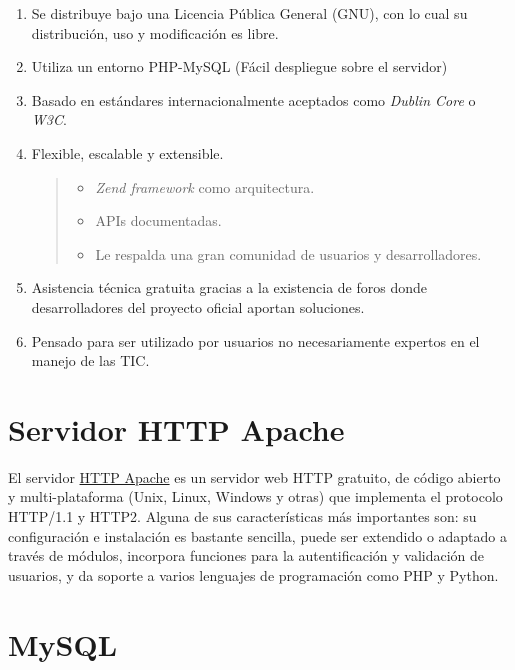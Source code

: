 \documentclass[
]{article}
\providecommand{\tightlist}{%
  \setlength{\itemsep}{0pt}\setlength{\parskip}{0pt}}
\begin{document}
\begin{enumerate}
\def\labelenumi{\arabic{enumi}.}
\item
  Se distribuye bajo una Licencia Pública General (GNU), con lo cual su
  distribución, uso y modificación es libre.
\item
  Utiliza un entorno PHP-MySQL (Fácil despliegue sobre el servidor)
\item
  Basado en estándares internacionalmente aceptados como \emph{Dublin
  Core} o \emph{W3C}.
\item
  Flexible, escalable y extensible.

  \begin{quote}
  \begin{itemize}
  \tightlist
  \item
    \emph{Zend framework} como arquitectura.
  \item
    APIs documentadas.
  \item
    Le respalda una gran comunidad de usuarios y desarrolladores.
  \end{itemize}
  \end{quote}
\item
  Asistencia técnica gratuita gracias a la existencia de foros donde
  desarrolladores del proyecto oficial aportan soluciones.
\item
  Pensado para ser utilizado por usuarios no necesariamente expertos en
  el manejo de las TIC.
\end{enumerate}

\hypertarget{servidor-http-apache}{%
\section{Servidor HTTP Apache}\label{servidor-http-apache}}

El servidor \href{https://httpd.apache.org/}{HTTP Apache} es un servidor
web HTTP gratuito, de código abierto y multi-plataforma (Unix, Linux,
Windows y otras) que implementa el protocolo HTTP/1.1 y HTTP2. Alguna de
sus características más importantes son: su configuración e instalación
es bastante sencilla, puede ser extendido o adaptado a través de
módulos, incorpora funciones para la autentificación y validación de
usuarios, y da soporte a varios lenguajes de programación como PHP y
Python.

\hypertarget{mysql}{%
\section{MySQL}\label{mysql}}
\end{document}

